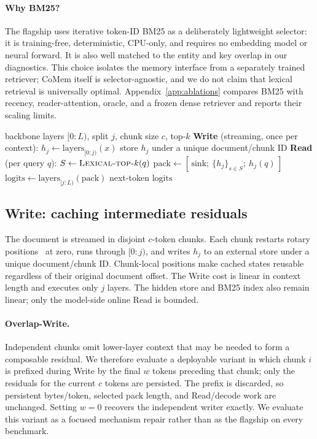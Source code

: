 \paragraph{Why BM25?} The flagship uses iterative token-ID BM25 as a deliberately
lightweight selector: it is training-free, deterministic, CPU-only, and requires
no embedding model or neural forward. It is also well matched to the entity and
key overlap in our diagnostics. This choice isolates the memory interface from a
separately trained retriever; CoMem itself is selector-agnostic, and we do not
claim that lexical retrieval is universally optimal. Appendix~\ref{app:ablations}
compares BM25 with recency, reader-attention, oracle, and a frozen dense
retriever and reports their scaling limits.

\begin{algorithm}[t]
\caption{CoMem: Write and Read}
\label{algo:comem}
\begin{algorithmic}[1]
\REQUIRE backbone layers $[0{:}L)$, split $j$, chunk size $c$, top-$k$
\STATE \textbf{Write} (streaming, once per context):
  \STATE $h_j \leftarrow \mathrm{layers}_{[0{:}j)}(x)$ 
  \STATE store $h_j$ under a unique document/chunk ID
\ENDFOR
\STATE \textbf{Read} (per query $q$):
\STATE $S \leftarrow \textsc{Lexical-top-}k(q)$ 
\STATE $\mathrm{pack} \leftarrow [\,\mathrm{sink};\ \{h_j\}_{s\in S};\ h_j(q)\,]$ 
\STATE $\mathrm{logits} \leftarrow \mathrm{layers}_{[j{:}L)}(\mathrm{pack})$ 
\RETURN next-token $\mathrm{logits}$
\end{algorithmic}
\end{algorithm}

\subsection{Write: caching intermediate residuals}
\label{subsec:write}
The document is streamed in disjoint $c$-token chunks. Each chunk restarts
rotary positions~\citep{roformer} at zero, runs through $[0{:}j)$, and writes
$h_j$ to an external store under a unique document/chunk ID. Chunk-local positions make cached states reusable regardless
of their original document offset. The Write cost is linear in context length
and executes only $j$ layers. The hidden store and BM25 index also remain linear;
only the model-side online Read is bounded.

\paragraph{Overlap-Write.}
Independent chunks omit lower-layer context that may be needed to form a
composable residual. We therefore evaluate a deployable variant in which chunk
$i$ is prefixed during Write by the final $w$ tokens preceding that chunk; only
the residuals for the current $c$ tokens are persisted. The prefix is discarded,
so persistent bytes/token, selected pack length, and Read/decode work are
unchanged. Setting $w{=}0$ recovers the independent writer exactly. We evaluate
this variant as a focused mechanism repair rather than as the flagship on every
benchmark.

